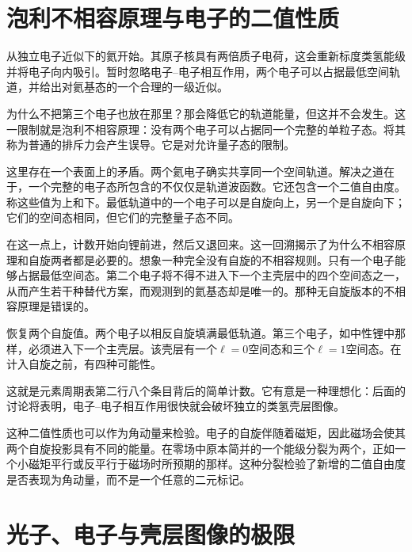 \section{泡利不相容原理与电子的二值性质}

从独立电子近似下的氦开始。其原子核具有两倍质子电荷，这会重新标度类氢能级并将电子向内吸引。暂时忽略电子--电子相互作用，两个电子可以占据最低空间轨道，并给出对氦基态的一个合理的一级近似。

为什么不把第三个电子也放在那里？那会降低它的轨道能量，但这并不会发生。这一限制就是泡利不相容原理：没有两个电子可以占据同一个完整的单粒子态。将其称为普通的排斥力会产生误导。它是对允许量子态的限制。

这里存在一个表面上的矛盾。两个氦电子确实共享同一个空间轨道。解决之道在于，一个完整的电子态所包含的不仅仅是轨道波函数。它还包含一个二值自由度。称这些值为上和下。最低轨道中的一个电子可以是自旋向上，另一个是自旋向下；它们的空间态相同，但它们的完整量子态不同。

在这一点上，计数开始向锂前进，然后又退回来。这一回溯揭示了为什么不相容原理和自旋两者都是必要的。想象一种完全没有自旋的不相容规则。只有一个电子能够占据最低空间态。第二个电子将不得不进入下一个主壳层中的四个空间态之一，从而产生若干种替代方案，而观测到的氦基态却是唯一的。那种无自旋版本的不相容原理是错误的。

恢复两个自旋值。两个电子以相反自旋填满最低轨道。第三个电子，如中性锂中那样，必须进入下一个主壳层。该壳层有一个\(\ell=0\)空间态和三个\(\ell=1\)空间态。在计入自旋之前，有四种可能性。

\begin{classroomqa}
\end{classroomqa}

这就是元素周期表第二行八个条目背后的简单计数。它有意是一种理想化：后面的讨论将表明，电子--电子相互作用很快就会破坏独立的类氢壳层图像。

这种二值性质也可以作为角动量来检验。电子的自旋伴随着磁矩，因此磁场会使其两个自旋投影具有不同的能量。在零场中原本简并的一个能级分裂为两个，正如一个小磁矩平行或反平行于磁场时所预期的那样。这种分裂检验了新增的二值自由度是否表现为角动量，而不是一个任意的二元标记。

\section{光子、电子与壳层图像的极限}


